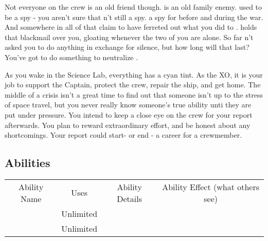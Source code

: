 \documentclass[char]{TMFHope}
\begin{document}
Not everyone on the crew is an old friend though. \cDip{} is an old family enemy. \cDip{\They} used to be a spy - you aren't sure that \cDip{\they} \cDip{\are}n't still a spy. \cDip{\They} \cDip{\were} a spy for \pPlan{} before and during the war. And somewhere in all of that \cDip{\they} claim\cDip{\plural} to have ferreted out what you did to \cCap{}. \cDip{} holds that blackmail over you, gloating whenever the two of you are alone. So far \cDip{\they} \cDip{\have}n't asked you to do anything in exchange for \cDip{\their} silence, but how long will that last? You've got to do something to neutralize \cDip{\them}.

As you wake in the Science Lab, everything has a cyan tint.  As the XO, it is your job to support the Captain, protect the crew, repair the ship, and get home. The middle of a crisis isn't a great time to find out that someone isn't up to the stress of space travel, but you never really know someone's true ability unti they are put under pressure. You intend to keep a close eye on the crew for your report afterwards. You plan to reward extraordinary effort, and be honest about any shortcomings. Your report could start- or end - a career for a crewmember.

\subsection{Abilities}
\begin{tabular}{ |c|c|c|c| } 
 \hline
 Ability Name & Uses & Ability Details & Ability Effect (what others see) \\ 
 \aThreat{\MyName} & Unlimited & \aThreat{\MYtext} & \aThreat{\MYeffect} \\ 
 \aCalculate{\MyName} & Unlimited & \aCalculate{\MYtext} & \aCalculate{\MYeffect}\\ 
 \hline
\end{tabular}
\end{document}
